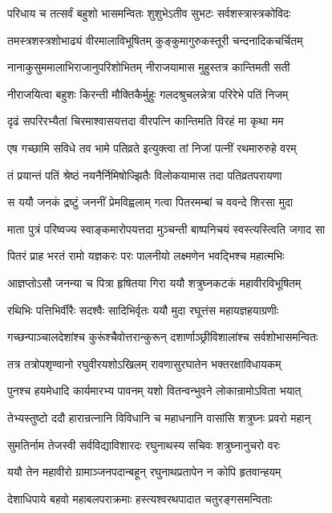 \twolineshloka
{परिधाय च तत्सर्वं बहुशो भासमन्वितः}
{शुशुभेऽतीव सुभटः सर्वशस्त्रास्त्रकोविदः}%

\twolineshloka
{तमस्त्रशस्त्रशोभाढ्यं वीरमालाविभूषितम्}
{कुङ्कुमागुरुकस्तूरी चन्दनादिकचर्चितम्}%

\twolineshloka
{नानाकुसुममालाभिराजानुपरिशोभितम्}
{नीराजयामास मुहुस्तत्र कान्तिमती सती}%

\twolineshloka
{नीराजयित्वा बहुशः किरन्ती मौक्तिकैर्मुहुः}
{गलदश्रुचलन्नेत्रा परिरेभे पतिं निजम्}%

\twolineshloka
{दृढं सपरिरभ्यैतां चिरमाश्वासयत्तदा}
{वीरपत्नि कान्तिमति विरहं मा कृथा मम}%

\twolineshloka
{एष गच्छामि सविधे तव भामे पतिव्रते}
{इत्युक्त्वा तां निजां पत्नीं रथमारुरुहे वरम्}%

\twolineshloka
{तं प्रयान्तं पतिं श्रेष्ठं नयनैर्निमिषोज्झितैः}
{विलोकयामास तदा पतिव्रतपरायणा}%

\twolineshloka
{स ययौ जनकं द्रष्टुं जननीं प्रेमविह्वलाम्}
{गत्वा पितरमम्बां च ववन्दे शिरसा मुदा}%

\twolineshloka
{माता पुत्रं परिष्वज्य स्वाङ्कमारोपयत्तदा}
{मुञ्चन्ती बाष्पनिचयं स्वस्त्यस्त्विति जगाद सा}%

\twolineshloka
{पितरं प्राह भरतं रामो यज्ञकरः परः}
{पालनीयो लक्ष्मणेन भवद्भिश्च महात्मभिः}%

\twolineshloka
{आज्ञप्तोऽसौ जनन्या च पित्रा हृषितया गिरा}
{ययौ शत्रुघ्नकटकं महावीरविभूषितम्}%

\twolineshloka
{रथिभिः पत्तिभिर्वीरैः सदश्वैः सादिभिर्वृतः}
{ययौ मुदा रघूत्तंस महायज्ञहयाग्रणीः}%

\twolineshloka
{गच्छन्पाञ्चालदेशांश्च कुरूंश्चैवोत्तरान्कुरून्}
{दशार्णाञ्छ्रीविशालांश्च सर्वशोभासमन्वितः}%

\twolineshloka
{तत्र तत्रोपशृण्वानो रघुवीरयशोऽखिलम्}
{रावणासुरघातेन भक्तरक्षाविधायकम्}%

\twolineshloka
{पुनश्च हयमेधादि कार्यमारभ्य पावनम्}
{यशो वितन्वन्भुवने लोकान्रामोऽविता भयात्}%

\twolineshloka
{तेभ्यस्तुष्टो ददौ हारान्रत्नानि विविधानि च}
{महाधनानि वासांसि शत्रुघ्नः प्रवरो महान्}%

\twolineshloka
{सुमतिर्नाम तेजस्वी सर्वविद्याविशारदः}
{रघुनाथस्य सचिवः शत्रुघ्नानुचरो वरः}%

\twolineshloka
{ययौ तेन महावीरो ग्रामाञ्जनपदान्बहून्}
{रघुनाथप्रतापेन न कोपि हृतवान्हयम्}%

\twolineshloka
{देशाधिपाये बहवो महाबलपराक्रमाः}
{हस्त्यश्वरथपादात चतुरङ्गसमन्विताः}%

